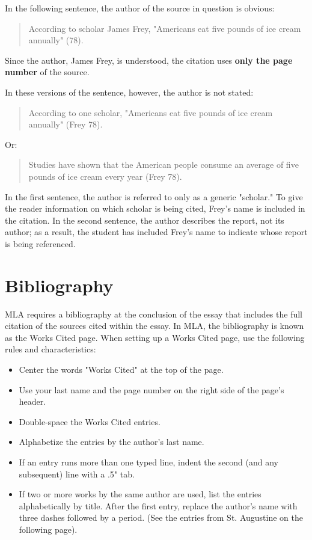In the following sentence, the author of the source in question is obvious:

\begin{quote}According to scholar James Frey, "Americans eat five pounds of ice cream 
annually" (78).
\end{quote}

Since the author, James Frey, is understood, the citation uses \textbf{only the page 
number} of the source.

In these versions of the sentence, however, the author is not stated:

\begin{quote}
According to one scholar, "Americans eat five pounds of ice cream annually" (Frey 78).
\end{quote}
Or:

\begin{quote}
Studies have shown that the American people consume an average of five pounds of ice 
cream every year (Frey 78).
\end{quote}
In the first sentence, the author is referred to only as a generic "scholar." To give the 
reader information on which scholar is being cited, Frey's name is included in the 
citation. In the second sentence, the author describes the report, not its author; as a 
result, the student has included Frey's name to indicate whose report is being referenced. 


\section{Bibliography}

MLA requires a bibliography at the conclusion of the essay that includes the full 
citation of the sources cited within the essay. In MLA, the bibliography is known as the 
Works Cited page. When setting up a Works Cited page, use the following rules and 
characteristics:

\begin{itemize}
\item Center the words "Works Cited" at the top of the page.
\item Use your last name and the page number on the right side of the page's header.
\item Double-space the Works Cited entries.
\item Alphabetize the entries by the author's last name.
\item If an entry runs more than one typed line, indent the second (and any 
subsequent) line with a .5" tab.
\item If two or more works by the same author are used, list the entries alphabetically 
by title. After the first entry, replace the author's name with three dashes followed by a 
period. (See the entries from St. Augustine on the following page).
\end{itemize}


